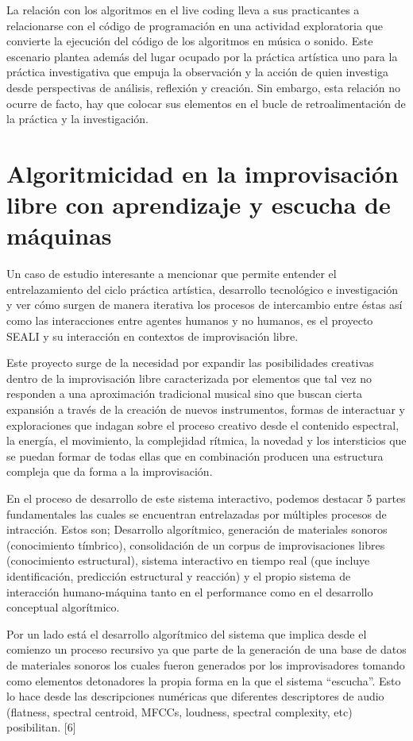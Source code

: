La relación con los algoritmos en el live coding lleva a sus practicantes a relacionarse con el código de programación en una actividad exploratoria que convierte la ejecución del código de los algoritmos en música o sonido. Este escenario plantea además del lugar ocupado por la práctica artística uno para la práctica investigativa que empuja la observación y la acción de quien investiga desde perspectivas de análisis, reflexión y creación. Sin embargo, esta relación no ocurre de facto, hay que colocar sus elementos en el bucle de retroalimentación de la práctica y la investigación.

\section{Algoritmicidad en la improvisación libre con aprendizaje y escucha de máquinas}

Un caso de estudio interesante a mencionar que permite entender el entrelazamiento del ciclo práctica artística, desarrollo tecnológico e investigación y ver cómo surgen de manera iterativa los procesos de intercambio entre éstas así como las interacciones entre agentes humanos y no humanos, es el proyecto SEALI y su interacción en contextos de improvisación libre. 

Este proyecto surge de la necesidad por expandir las posibilidades creativas dentro de la improvisación libre caracterizada por elementos que tal vez no responden a una aproximación tradicional musical sino que buscan cierta expansión a través de la creación de nuevos instrumentos, formas de interactuar y exploraciones que indagan sobre el proceso creativo desde el contenido espectral, la energía, el movimiento, la complejidad rítmica, la novedad y los intersticios que se puedan formar de todas ellas que en combinación producen una estructura compleja que da forma a la improvisación. 

En el proceso de desarrollo de este sistema interactivo, podemos destacar 5 partes fundamentales las cuales se encuentran entrelazadas por múltiples procesos de intracción. Estos son; Desarrollo algorítmico, generación de materiales sonoros (conocimiento tímbrico), consolidación de un corpus de improvisaciones libres (conocimiento estructural), sistema interactivo en tiempo real (que incluye identificación, predicción estructural y reacción) y el propio sistema de interacción humano-máquina tanto en el performance como en el desarrollo conceptual algorítmico. 

Por un lado está el desarrollo algorítmico del sistema que implica desde el comienzo un proceso recursivo ya que parte de la generación de una base de datos de materiales sonoros los cuales fueron generados por los improvisadores tomando como elementos detonadores la propia forma en la que el sistema “escucha”. Esto lo hace desde las descripciones numéricas que diferentes descriptores de audio (flatness, spectral centroid, MFCCs, loudness, spectral complexity, etc) posibilitan. [6]

